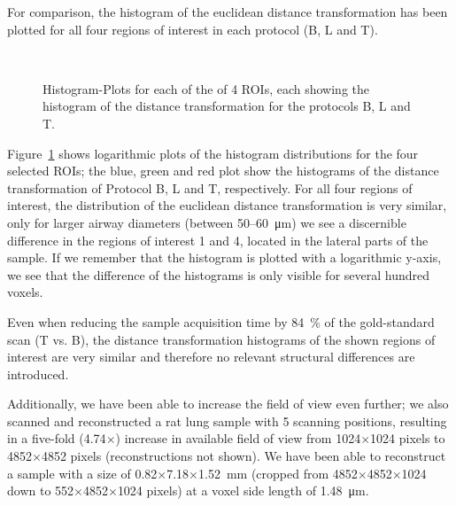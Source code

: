 For comparison, the histogram of the euclidean distance transformation has been plotted for all four regions of interest in each protocol (B, L and T).

\renewcommand{\imsize}{.5\columnwidth}
\begin{figure}
	\centering
	\caption{Histogram-Plots for each of the of 4 ROIs, each showing the histogram of the distance transformation for the protocols B, L and T.}%
	\ifiucr%
		\\%
	\else
	\fi	
	\label{fig:DTFplots}
\end{figure}

Figure~\ref{fig:DTFplots} shows logarithmic plots of the histogram distributions for the four selected ROIs; the blue, green and red plot show the histograms of the distance transformation of Protocol B, L and T, respectively. For all four regions of interest, the distribution of the euclidean distance transformation is very similar, only for larger airway diameters (between 50--\SI{60}{\micro\meter}) we see a discernible difference in the regions of interest 1 and 4, located in the lateral parts of the sample. If we remember that the histogram is plotted with a logarithmic y-axis, we see that the difference of the histograms is only visible for several hundred voxels.

Even when reducing the sample acquisition time by \SI{84}{\percent} of the gold-standard scan (T vs. B), the distance transformation histograms of the shown regions of interest are very similar and therefore no relevant structural differences are introduced.

Additionally, we have been able to increase the field of view even further; we also scanned and reconstructed a rat lung sample with 5 scanning positions, resulting in a five-fold (4.74$\times$) increase in available field of view %
%
 from 1024$\times$1024 pixels to 4852$\times$4852 pixels (reconstructions not shown). We have been able to reconstruct a sample with a size of 0.82$\times$7.18$\times$\SI{1.52}{\milli\meter} (cropped from 4852$\times$4852$\times$1024 down to 552$\times$4852$\times$1024 pixels) at a voxel side length of \SI{1.48}{\micro\meter}.